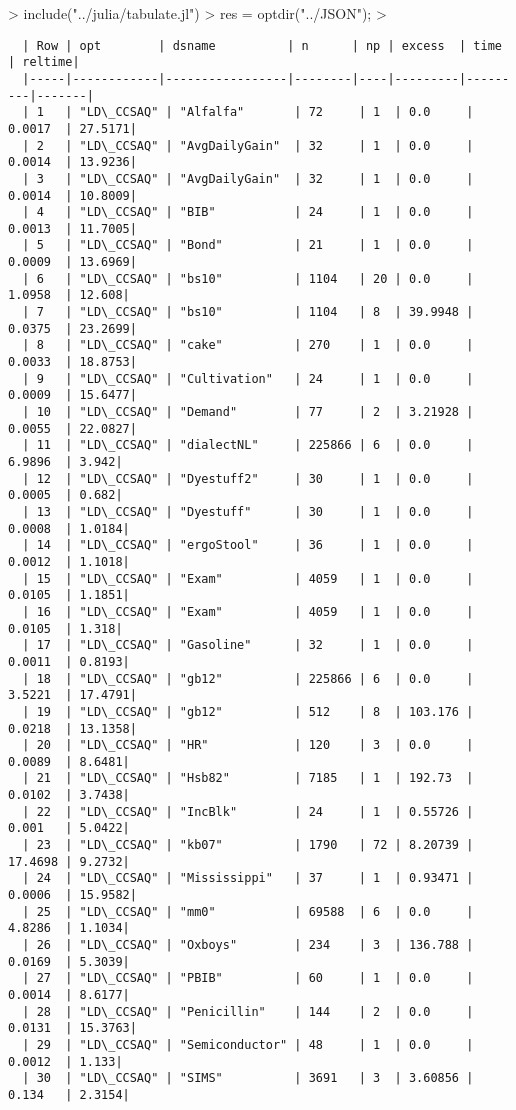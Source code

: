 \documentclass[article]{jss}
\begin{document}
\begin{Schunk}
\begin{Sinput}
> include("../julia/tabulate.jl")
> res = optdir("../JSON");
> 
\end{Sinput}
\end{Schunk}



\begin{verbatim}
  | Row | opt        | dsname          | n      | np | excess  | time    | reltime|    
  |-----|------------|-----------------|--------|----|---------|---------|-------|
  | 1   | "LD\_CCSAQ" | "Alfalfa"       | 72     | 1  | 0.0     | 0.0017  | 27.5171|
  | 2   | "LD\_CCSAQ" | "AvgDailyGain"  | 32     | 1  | 0.0     | 0.0014  | 13.9236|
  | 3   | "LD\_CCSAQ" | "AvgDailyGain"  | 32     | 1  | 0.0     | 0.0014  | 10.8009|
  | 4   | "LD\_CCSAQ" | "BIB"           | 24     | 1  | 0.0     | 0.0013  | 11.7005|
  | 5   | "LD\_CCSAQ" | "Bond"          | 21     | 1  | 0.0     | 0.0009  | 13.6969|
  | 6   | "LD\_CCSAQ" | "bs10"          | 1104   | 20 | 0.0     | 1.0958  | 12.608|
  | 7   | "LD\_CCSAQ" | "bs10"          | 1104   | 8  | 39.9948 | 0.0375  | 23.2699|
  | 8   | "LD\_CCSAQ" | "cake"          | 270    | 1  | 0.0     | 0.0033  | 18.8753|
  | 9   | "LD\_CCSAQ" | "Cultivation"   | 24     | 1  | 0.0     | 0.0009  | 15.6477|
  | 10  | "LD\_CCSAQ" | "Demand"        | 77     | 2  | 3.21928 | 0.0055  | 22.0827|
  | 11  | "LD\_CCSAQ" | "dialectNL"     | 225866 | 6  | 0.0     | 6.9896  | 3.942|
  | 12  | "LD\_CCSAQ" | "Dyestuff2"     | 30     | 1  | 0.0     | 0.0005  | 0.682|
  | 13  | "LD\_CCSAQ" | "Dyestuff"      | 30     | 1  | 0.0     | 0.0008  | 1.0184|
  | 14  | "LD\_CCSAQ" | "ergoStool"     | 36     | 1  | 0.0     | 0.0012  | 1.1018|
  | 15  | "LD\_CCSAQ" | "Exam"          | 4059   | 1  | 0.0     | 0.0105  | 1.1851|
  | 16  | "LD\_CCSAQ" | "Exam"          | 4059   | 1  | 0.0     | 0.0105  | 1.318|
  | 17  | "LD\_CCSAQ" | "Gasoline"      | 32     | 1  | 0.0     | 0.0011  | 0.8193|
  | 18  | "LD\_CCSAQ" | "gb12"          | 225866 | 6  | 0.0     | 3.5221  | 17.4791|
  | 19  | "LD\_CCSAQ" | "gb12"          | 512    | 8  | 103.176 | 0.0218  | 13.1358|
  | 20  | "LD\_CCSAQ" | "HR"            | 120    | 3  | 0.0     | 0.0089  | 8.6481|
  | 21  | "LD\_CCSAQ" | "Hsb82"         | 7185   | 1  | 192.73  | 0.0102  | 3.7438|
  | 22  | "LD\_CCSAQ" | "IncBlk"        | 24     | 1  | 0.55726 | 0.001   | 5.0422|
  | 23  | "LD\_CCSAQ" | "kb07"          | 1790   | 72 | 8.20739 | 17.4698 | 9.2732|
  | 24  | "LD\_CCSAQ" | "Mississippi"   | 37     | 1  | 0.93471 | 0.0006  | 15.9582|
  | 25  | "LD\_CCSAQ" | "mm0"           | 69588  | 6  | 0.0     | 4.8286  | 1.1034|
  | 26  | "LD\_CCSAQ" | "Oxboys"        | 234    | 3  | 136.788 | 0.0169  | 5.3039|
  | 27  | "LD\_CCSAQ" | "PBIB"          | 60     | 1  | 0.0     | 0.0014  | 8.6177|
  | 28  | "LD\_CCSAQ" | "Penicillin"    | 144    | 2  | 0.0     | 0.0131  | 15.3763|
  | 29  | "LD\_CCSAQ" | "Semiconductor" | 48     | 1  | 0.0     | 0.0012  | 1.133|
  | 30  | "LD\_CCSAQ" | "SIMS"          | 3691   | 3  | 3.60856 | 0.134   | 2.3154|
  
\end{verbatim}
\end{document}
